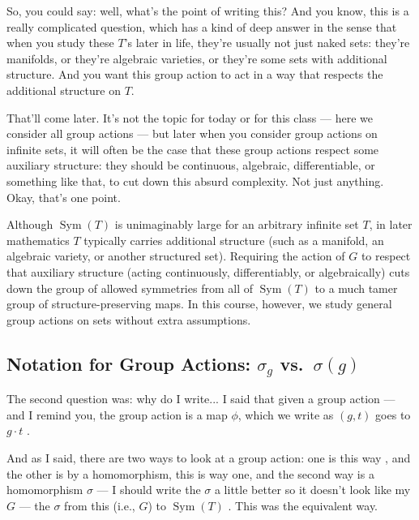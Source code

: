 \begin{speech}[00:02:17 - 00:03:08]
So, you could say: well, what's the point of writing this? And you know, this is a really complicated question, which has a kind of deep answer in the sense that when you study these $T$'s later in life, they're usually not just naked sets: they're manifolds, or they're algebraic varieties, or they're some sets with additional structure. And you want this group action to act in a way that respects the additional structure on $T$.

That'll come later. It's not the topic for today or for this class --- here we consider all group actions --- but later when you consider group actions on infinite sets, it will often be the case that these group actions respect some auxiliary structure: they should be continuous, algebraic, differentiable, or something like that, to cut down this absurd complexity. Not just anything. Okay, that's one point.
\end{speech}

\begin{insight}
Although $\operatorname{Sym}(T)$ is unimaginably large for an arbitrary infinite set $T$, in later mathematics $T$ typically carries additional structure (such as a manifold, an algebraic variety, or another structured set). Requiring the action of $G$ to respect that auxiliary structure (acting continuously, differentiably, or algebraically) cuts down the group of allowed symmetries from all of $\operatorname{Sym}(T)$ to a much tamer group of structure-preserving maps. In this course, however, we study general group actions on sets without extra assumptions.
\end{insight}

\subsection{Notation for Group Actions: \texorpdfstring{$\sigma_g$ vs.\ $\sigma(g)$}{sigma\_g vs. sigma(g)}}

\begin{speech}[00:03:08 - 00:03:54]
The second question was: why do I write... I said that given a group action  --- and I remind you, the group action is a map $\phi$, which we write as $(g, t)$ goes to $g \cdot t$ .

And as I said, there are two ways to look at a group action: one is this way , and the other is by a homomorphism, this is way one, and the second way is a homomorphism $\sigma$ --- I should write the $\sigma$ a little better so it doesn't look like my $G$ --- the $\sigma$ from this (i.e., $G$) to $\operatorname{Sym}(T)$ . This was the equivalent way.
\end{speech}

